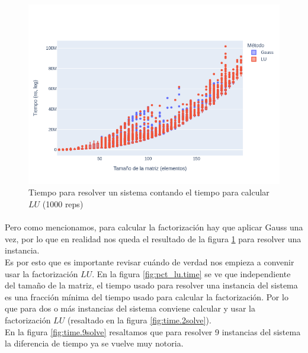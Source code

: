 \documentclass[12pt]{article}
\begin{document}
\begin{figure}[H]
\centering
\includegraphics[scale=0.5]{times.1.t_solve_lu}
\caption{Tiempo para resolver un sistema contando el tiempo para calcular \(LU\) (1000 reps)}
\label{fig:solve.lu.time}
\end{figure}

\paragraph{} Pero como mencionamos, para calcular la factorización hay que aplicar Gauss una vez, por lo que en realidad nos queda el resultado de la figura \ref{fig:solve.lu.time} para resolver una instancia. \\
Es por esto que es importante revisar cuándo de verdad nos empieza a convenir usar la factorización \(LU\). En la figura \ref{fig:pct_lu.time} se ve que independiente del tamaño de la matriz, el tiempo usado para resolver una instancia del sistema es una fracción mínima del tiempo usado para calcular la factorización. Por lo que para dos o más instancias del sistema conviene calcular y usar la factorización \(LU\) (resaltado en la figura \ref{fig:time.2solve}). \\
En la figura \ref{fig:time.9solve} resaltamos que para resolver 9 instancias del sistema la diferencia de tiempo ya se vuelve muy notoria.
\end{document}
